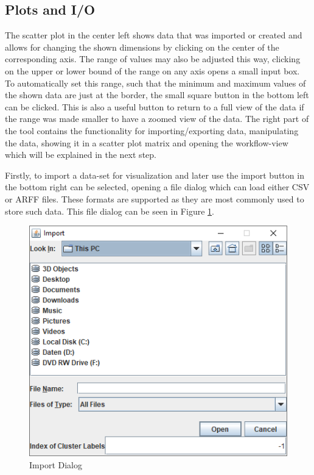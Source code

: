 \documentclass[
	a4paper,
	english,
	twoside,
	openright,               
	11pt                            
	]{report}
\begin{document}
\subsection{Plots and I/O}\label{sec:plotio}

The scatter plot in the center left shows data that was imported or created and allows for changing the shown dimensions by clicking on the center of the corresponding axis. The range of values may also be adjusted this way, clicking on the upper or lower bound of the range on any axis opens a small input box. To automatically set this range, such that the minimum and maximum values of the shown data are just at the border, the small square button in the bottom left can be clicked. This is also a useful button to return to a full view of the data if the range was made smaller to have a zoomed view of the data. The right part of the tool contains the functionality for importing/exporting data, manipulating the data, showing it in a scatter plot matrix and opening the workflow-view which will be explained in the next step.

 Firstly, to import a data-set for visualization and later use the import button in the bottom right can be selected, opening a file dialog which can load either CSV or ARFF files. These formats are supported as they are most commonly used to store such data. This file dialog can be seen in Figure \ref{fig:data-import}. 

\begin{figure}[h]
	\centering 
	\includegraphics[scale=.45]{data-import}%
	\caption{Import Dialog}
	\label{fig:data-import}
\end{figure}
\end{document}
